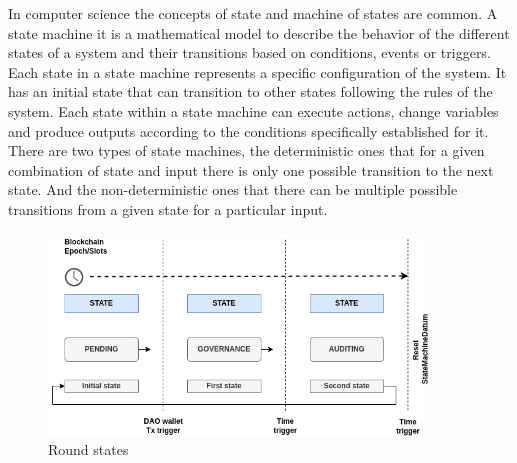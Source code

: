 \documentclass[9pt]{article}
\begin{document}
In computer science the concepts of state and machine of states are common. A state machine it is a mathematical model to describe the behavior of the different states of a system and their transitions based on conditions, events or triggers. Each state in a state machine represents a specific configuration of the system. It has an initial state that can transition to other states following the rules of the system. Each state within a state machine can execute actions, change variables and produce outputs according to the conditions specifically established for it. There are two types of state machines, the deterministic ones that for a given combination of state and input there is only one possible transition to the next state. And the non-deterministic ones that there can be multiple possible transitions from a given state for a particular input.

\begin{figure}[ht]
  \centering
  \includegraphics[width=0.9\textwidth]{machine.png}
  \caption{Round states}
  \label{fig:Round states}
\end{figure}
\end{document}
